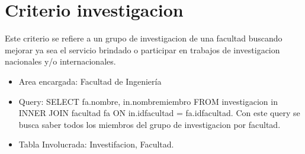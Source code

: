 \documentclass[12pt,a4paper]{report}
\begin{document}
\section{ Criterio investigacion}
Este criterio se refiere a un grupo de investigacion de una facultad buscando mejorar ya sea el servicio brindado o participar en trabajos de investigacion nacionales y/o internacionales.

\begin{itemize}
\item Area encargada: Facultad de Ingeniería

\item Query: SELECT fa.nombre, in.nombremiembro FROM investigacion in INNER JOIN facultad fa ON in.idfacultad = fa.idfacultad. Con este query se busca saber todos los miembros del grupo de investigacion por facultad.

\item Tabla Involucrada: Investifacion, Facultad.
\end{itemize}
\end{document}
